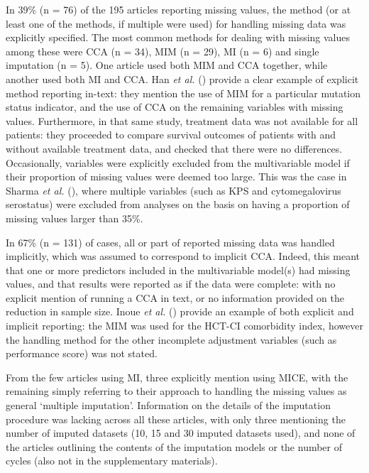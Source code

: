 \documentclass[
  letterpaper,
  paper=240mm:170mm,
  twoside=true,
  open=right,
  fontsize=10pt,
  pagesize=false,
  BCOR=15mm,
  DIV=14,
  headinclude=true,
  footinclude=false,
  headsepline=on]{scrbook}
\begin{document}
In 39\% (n = 76) of the 195 articles reporting missing values, the
method (or at least one of the methods, if multiple were used) for
handling missing data was explicitly specified. The most common methods
for dealing with missing values among these were CCA (n = 34), MIM (n =
29), MI (n = 6) and single imputation (n = 5). One article used both MIM
and CCA together, while another used both MI and CCA. Han \emph{et al.}
() provide
a clear example of explicit method reporting in-text: they mention the
use of MIM for a particular mutation status indicator, and the use of
CCA on the remaining variables with missing values. Furthermore, in that
same study, treatment data was not available for all patients: they
proceeded to compare survival outcomes of patients with and without
available treatment data, and checked that there were no differences.
Occasionally, variables were explicitly excluded from the multivariable
model if their proportion of missing values were deemed too large. This
was the case in Sharma \emph{et al.}
(), where
multiple variables (such as KPS and cytomegalovirus serostatus) were
excluded from analyses on the basis on having a proportion of missing
values larger than 35\%.

In 67\% (n = 131) of cases, all or part of reported missing data was
handled implicitly, which was assumed to correspond to implicit CCA.
Indeed, this meant that one or more predictors included in the
multivariable model(s) had missing values, and that results were
reported as if the data were complete: with no explicit mention of
running a CCA in text, or no information provided on the reduction in
sample size. Inoue \emph{et al.}
() provide an
example of both explicit and implicit reporting: the MIM was used for
the HCT-CI comorbidity index, however the handling method for the other
incomplete adjustment variables (such as performance score) was not
stated.

From the few articles using MI, three explicitly mention using MICE,
with the remaining simply referring to their approach to handling the
missing values as general `multiple imputation'. Information on the
details of the imputation procedure was lacking across all these
articles, with only three mentioning the number of imputed datasets (10,
15 and 30 imputed datasets used), and none of the articles outlining the
contents of the imputation models or the number of cycles (also not in
the supplementary materials).
\end{document}
